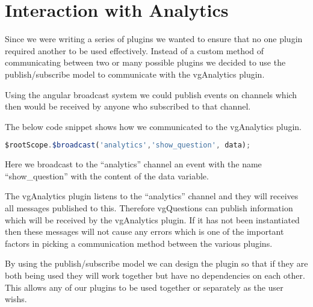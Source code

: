 \section{Interaction with Analytics}
\label{Section:vgQuestions Analytics}

Since we were writing a series of plugins we wanted to ensure that no one plugin required another to be used effectively. Instead of a custom method of communicating between two or many possible plugins we decided to use the publish/subscribe model to communicate with the vgAnalytics plugin.

Using the angular broadcast system we could publish events on channels which then would be received by anyone who subscribed to that channel.

The below code snippet shows how we communicated to the vgAnalytics plugin.

\begin{lstlisting}[language=javascript]
$rootScope.$broadcast('analytics','show_question', data);
\end{lstlisting}

Here we broadcast to the ``analytics'' channel an event with the name ``show\_question'' with the content of the data variable.

The vgAnalytics plugin listens to the ``analytics'' channel and they will receives all messages published to this. Therefore vgQuestions can publish information which will be received by the vgAnalytics plugin. If it has not been instantiated then these messages will not cause any errors which is one of the important factors in picking a communication method between the various plugins.

By using the publish/subscribe model we can design the plugin so that if they are both being used they will work together but have no dependencies on each other. This allows any of our plugins to be used together or separately as the user wishs.

